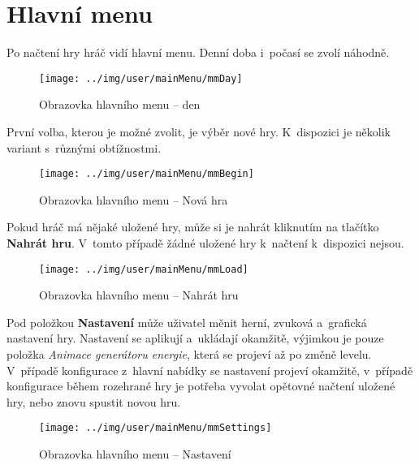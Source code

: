 
\section{Hlavní menu}

Po načtení hry hráč vidí hlavní menu. Denní doba i~počasí se zvolí náhodně.

\begin{figure}[!ht]\centering
\texttt{[image: ../img/user/mainMenu/mmDay]}

\caption{Obrazovka hlavního menu -- den}
\label{fig:user_mainMenu_mmDay}

\end{figure}


\FloatBarrier

První volba, kterou je možné zvolit, je výběr nové hry. K~dispozici je několik variant s~různými obtížnostmi.

\begin{figure}[!ht]\centering
\texttt{[image: ../img/user/mainMenu/mmBegin]}

\caption{Obrazovka hlavního menu -- Nová hra}
\label{fig:user_mainMenu_mmBegin}

\end{figure}
\FloatBarrier

Pokud hráč má nějaké uložené hry, může si je nahrát kliknutím na tlačítko \textbf{Nahrát hru}. V~tomto případě žádné uložené hry k~načtení k~dispozici nejsou.

\begin{figure}[!ht]\centering
\texttt{[image: ../img/user/mainMenu/mmLoad]}

\caption{Obrazovka hlavního menu -- Nahrát hru}
\label{fig:user_mainMenu_mmLoad}

\end{figure}
\FloatBarrier

Pod položkou \textbf{Nastavení} může uživatel měnit herní, zvuková a~grafická nastavení hry. Nastavení se aplikují a~ukládají okamžitě, výjimkou je pouze položka \textit{Animace generátoru energie}, která se projeví až po změně levelu. V~případě konfigurace z~hlavní nabídky se nastavení projeví okamžitě, v~případě konfigurace během rozehrané hry je potřeba vyvolat opětovné načtení uložené hry, nebo znovu spustit novou hru.

\begin{figure}[!ht]\centering
\texttt{[image: ../img/user/mainMenu/mmSettings]}

\caption{Obrazovka hlavního menu -- Nastavení}
\label{fig:user_mainMenu_mmSettings}

\end{figure}

\FloatBarrier